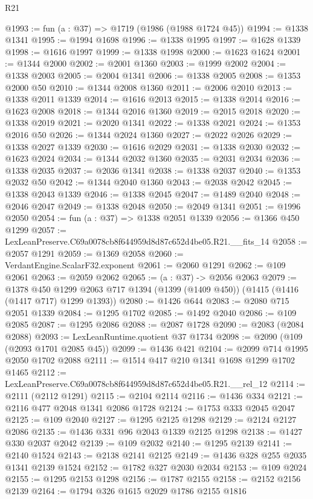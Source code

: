 \begin{lexlean}{R21}
\begin{coremodule}
@1993 := fun (a : @37) => @1719 (@1986 (@1988 @1724 @45))
@1994 := @1338 @1341
@1995 := @1994 @1698
@1996 := @1338 @1995
@1997 := @1628 @1339
@1998 := @1616 @1997
@1999 := @1338 @1998
@2000 := @1623 @1624
@2001 := @1344 @2000
@2002 := @2001 @1360
@2003 := @1999 @2002
@2004 := @1338 @2003
@2005 := @2004 @1341
@2006 := @1338 @2005
@2008 := @1353 @2000 @50
@2010 := @1344 @2008 @1360
@2011 := @2006 @2010
@2013 := @1338 @2011 @1339
@2014 := @1616 @2013
@2015 := @1338 @2014
@2016 := @1623 @2008
@2018 := @1344 @2016 @1360
@2019 := @2015 @2018
@2020 := @1338 @2019
@2021 := @2020 @1341
@2022 := @1338 @2021
@2024 := @1353 @2016 @50
@2026 := @1344 @2024 @1360
@2027 := @2022 @2026
@2029 := @1338 @2027 @1339
@2030 := @1616 @2029
@2031 := @1338 @2030
@2032 := @1623 @2024
@2034 := @1344 @2032 @1360
@2035 := @2031 @2034
@2036 := @1338 @2035
@2037 := @2036 @1341
@2038 := @1338 @2037
@2040 := @1353 @2032 @50
@2042 := @1344 @2040 @1360
@2043 := @2038 @2042
@2045 := @1338 @2043 @1339
@2046 := @1338 @2045
@2047 := @1489 @2040
@2048 := @2046 @2047
@2049 := @1338 @2048
@2050 := @2049 @1341
@2051 := @1996 @2050
@2054 := fun (a : @37) => @1338 @2051 @1339
@2056 := @1366 @450 @1299
@2057 := LexLeanPreserve.C69a0078cb8f644959d8d87c652d4be05.R21.__fits_14
@2058 := @2057 @1291
@2059 := @1369 @2058
@2060 := VerdantEngine.ScalarF32.exponent
@2061 := @2060 @1291
@2062 := @109 @2061
@2063 := @2059 @2062
@2065 := (a : @37) -> @2056 @2063
@2079 := @1378
    @450
    @1299
    @2063
    @717
    @1394
    (@1399 (@1409 @450))
    (@1415 (@1416 (@1417 @717) @1299 @1393))
@2080 := @1426 @644
@2083 := @2080 @715 @2051 @1339
@2084 := @1295 @1702
@2085 := @1492 @2040
@2086 := @109 @2085
@2087 := @1295 @2086
@2088 := @2087 @1728
@2090 := @2083 (@2084 @2088)
@2093 := LexLeanRuntime.quotient @37 @1734
@2098 := @2090 (@109 (@2093 @1701 @2085 @45))
@2099 := @1436 @421
@2104 := @2099 @714 @1995 @2050 @1702 @2088
@2111 := @1514 @417 @210 @1341 @1698 @1299 @1702 @1465
@2112 := LexLeanPreserve.C69a0078cb8f644959d8d87c652d4be05.R21.__rel_12
@2114 := @2111 (@2112 @1291)
@2115 := @2104 @2114
@2116 := @1436 @334
@2121 := @2116 @477 @2048 @1341 @2086 @1728
@2124 := @1753 @333 @2045 @2047
@2125 := @109 @2040
@2127 := @1295 @2125 @1298
@2129 := @2124 @2127 @2086
@2135 := @1436 @331 @96 @2043 @1339 @2125 @1298
@2138 := @1427 @330 @2037 @2042
@2139 := @109 @2032
@2140 := @1295 @2139
@2141 := @2140 @1524
@2143 := @2138 @2141 @2125
@2149 := @1436 @328 @255 @2035 @1341 @2139 @1524
@2152 := @1782 @327 @2030 @2034
@2153 := @109 @2024
@2155 := @1295 @2153 @1298
@2156 := @1787 @2155
@2158 := @2152 @2156 @2139
@2164 := @1794 @326 @1615 @2029 @1786 @2155 @1816

\end{coremodule}
\end{lexlean}
